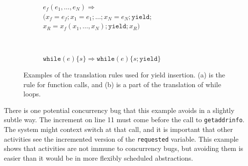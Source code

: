 \documentclass[9pt,preprint]{sigplanconf}
\begin{document}
\begin{figure}
    \centering
    \begin{subfigure}[b]{0.5\textwidth}
  $e_f(e_1, \ldots, e_N) \Rightarrow$ \\
  \hspace*{1em} $( x_f=e_f; x_1=e_1; \ldots; x_N=e_N; \mathtt{yield};$ \\
  \hspace*{2em} $x_R=x_f(x_1, \ldots, x_N); \mathtt{yield}; x_R )$
        \caption{}
    \end{subfigure}
    ~ %
    \begin{subfigure}[b]{0.5\textwidth}
  $\mathtt{while}( e ) \{ s \} \Rightarrow \mathtt{while}( e ) \{ s; \mathtt{yield} \}$
        \caption{}
    \end{subfigure}
    \caption{Examples of the translation rules used for yield insertion.
      (a) is the rule for function calls, and (b) is a part of the translation of while loops.}
    \label{fig:translation}
\end{figure}

There is one potential concurrency bug that this example avoids in a slightly subtle way.
The increment on line 11 must come before the call to \texttt{getaddrinfo}.
The system might context switch at that call, and it is important that other activities see the incremented version of the \texttt{requested} variable.
This example shows that activities are not immune to concurrency bugs, but avoiding them is easier than it would be in more flexibly scheduled abstractions.







\end{document}
